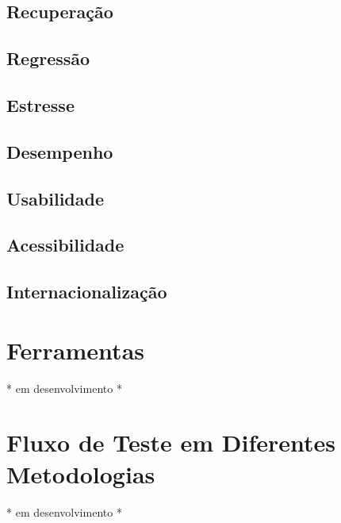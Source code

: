 \documentclass[
	12pt,				%
	openright,			%
	oneside,			%
	a4paper,			%
	english,			%
	brazil,				%
	]{abntex2}
\begin{document}
\subsection{Recuperação}

\subsection{Regressão}

\subsection{Estresse}

\subsection{Desempenho}

\subsection{Usabilidade}

\subsection{Acessibilidade}

\subsection{Internacionalização}

\section{Ferramentas}
* em desenvolvimento *

\section{Fluxo de Teste em Diferentes Metodologias}
* em desenvolvimento *

% 

\end{document}
